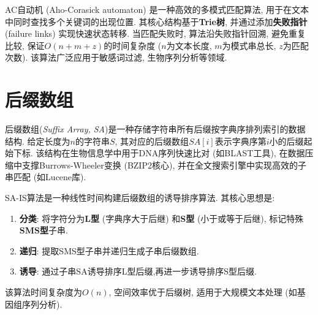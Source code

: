 \documentclass[a4paper]{ctexbook}
\begin{document}
AC自动机 (Aho-Corasick automaton) 是一种高效的多模式匹配算法, 用于在文本中同时查找多个关键词的出现位置. 其核心结构基于\textbf{Trie树}, 并通过添加\textbf{失败指针} (failure links) 实现快速状态转移.
当匹配失败时, 算法沿失败指针回溯, 避免重复比较, 保证$O(n+m+z)$的时间复杂度 ($n$为文本长度, $m$为模式串总长, $z$为匹配次数). 该算法广泛应用于敏感词过滤, 生物序列分析等领域.



\section{后缀数组}

后缀数组(\textit{Suffix Array, SA})是一种存储字符串所有后缀按字典序排列索引的数据结构. 给定长度为$n$的字符串$S$, 其对应的后缀数组$SA[i]$表示字典序第$i$小的后缀起始下标. 该结构在生物信息学中用于DNA序列快速比对 (如BLAST工具), 在数据压缩中支撑Burrows-Wheeler变换 (BZIP2核心), 并在全文搜索引擎中实现高效的子串匹配 (如Lucene库).

SA-IS算法是一种线性时间构建后缀数组的诱导排序算法. 其核心思想是:
\begin{enumerate}
  \item \textbf{分类}: 将字符分为\textbf{L型} (字典序大于后继) 和\textbf{S型} (小于或等于后继), 标记特殊\textbf{SMS型}子串.
	\item \textbf{递归}: 提取SMS型子串并递归生成子串后缀数组.
	\item \textbf{诱导}: 通过子串SA诱导排序L型后缀,再进一步诱导排序S型后缀.
\end{enumerate}
该算法时间复杂度为$O(n)$, 空间效率优于后缀树, 适用于大规模文本处理 (如基因组序列分析).


\end{document}
